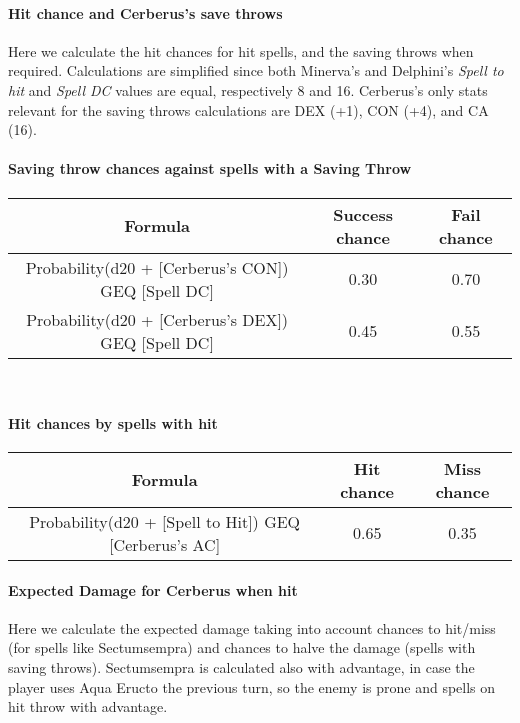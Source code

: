 \paragraph{Hit chance and Cerberus's save throws} Here we calculate the hit chances for hit spells, and the saving throws when required.
Calculations are simplified since both Minerva's and Delphini's \textit{Spell to hit} and \textit{Spell DC} values are equal, respectively 8 and 16.
Cerberus's only stats relevant for the saving throws calculations are DEX (+1), CON (+4), and CA (16). \\

\paragraph{Saving throw chances against spells with a Saving Throw}

\begin{tabular}{c|c|c}
	\textbf{Formula} & \textbf{Success chance} & \textbf{Fail chance} \\ \hline
	Probability(d20 + [Cerberus's CON]) GEQ [Spell DC]      & 0.30 & 0.70 \\
	Probability(d20 + [Cerberus's DEX]) GEQ [Spell DC]      & 0.45 & 0.55 \\ \hline
\end{tabular} \\

\paragraph{Hit chances by spells with hit}

\begin{tabular}{c|c|c}
	\textbf{Formula} & \textbf{Hit chance} & \textbf{Miss chance} \\ \hline
	Probability(d20 + [Spell to Hit]) GEQ [Cerberus's AC]   & 0.65 & 0.35 \\ \hline
\end{tabular}

\paragraph{Expected Damage for Cerberus when hit} Here we calculate the expected damage taking into account chances to hit/miss (for spells like Sectumsempra) and chances to halve the damage (spells with saving throws). Sectumsempra is calculated also with advantage, in case the player uses Aqua Eructo the previous turn, so the enemy is prone and spells on hit throw with advantage.

